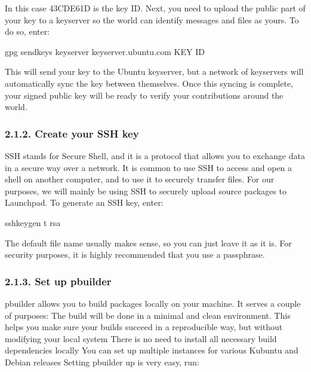 \documentclass[letterpaper,10pt,english]{sphinxmanual}
\begin{document}
\sphinxAtStartPar
In this case 43CDE61D is the key ID.
Next, you need to upload the public part of your key to a keyserver so the world can identify messages and files as yours. To do so, enter:

\begin{sphinxVerbatim}[commandchars=\\\{\}]
\PYGZdl{} gpg \PYGZhy{}\PYGZhy{}send\PYGZhy{}keys \PYGZhy{}\PYGZhy{}keyserver keyserver.ubuntu.com \PYGZlt{}KEY ID\PYGZgt{}
\end{sphinxVerbatim}

\sphinxAtStartPar
This will send your key to the Ubuntu keyserver, but a network of keyservers will automatically sync the key between themselves. Once this syncing is complete, your signed public key will be ready to verify your contributions around the world.


\subsubsection{2.1.2. Create your SSH key}
\label{\detokenize{docs/packaging-guide/getting-started:create-your-ssh-key}}
\sphinxAtStartPar
SSH stands for Secure Shell, and it is a protocol that allows you to exchange data in a secure way over a network. It is common to use SSH to access and open a shell on another computer, and to use it to securely transfer files. For our purposes, we will mainly be using SSH to securely upload source packages to Launchpad.
To generate an SSH key, enter:

\begin{sphinxVerbatim}[commandchars=\\\{\}]
\PYGZdl{} ssh\PYGZhy{}keygen \PYGZhy{}t rsa
\end{sphinxVerbatim}

\sphinxAtStartPar
The default file name usually makes sense, so you can just leave it as it is. For security purposes, it is highly recommended that you use a passphrase.


\subsubsection{2.1.3. Set up pbuilder}
\label{\detokenize{docs/packaging-guide/getting-started:set-up-pbuilder}}
\sphinxAtStartPar
pbuilder allows you to build packages locally on your machine. It serves a couple of purposes:
The build will be done in a minimal and clean environment. This helps you make sure your builds succeed in a reproducible way, but without modifying your local system
There is no need to install all necessary build dependencies locally
You can set up multiple instances for various Kubuntu and Debian releases
Setting pbuilder up is very easy, run:
\end{document}
